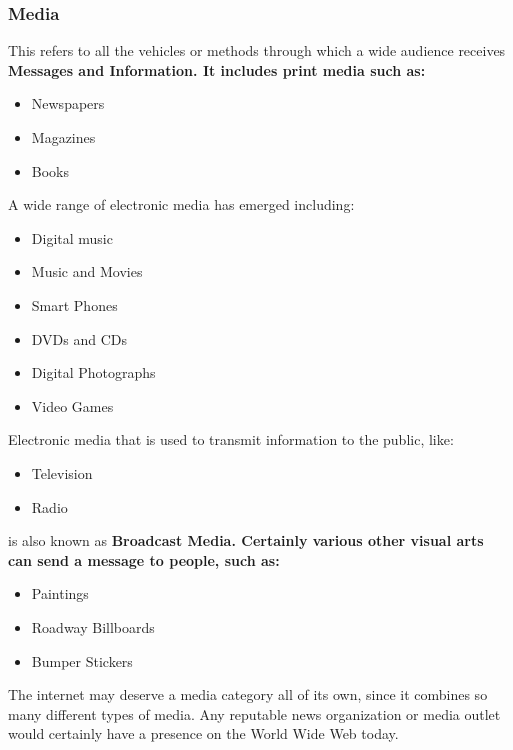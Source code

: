 
\subsubsection*{Media}

This refers to all the vehicles or methods through which a wide audience receives \bf{Messages} and \bf{Information}. It includes print media such as:

\begin{itemize}
    \item Newspapers
    \item Magazines
    \item Books
\end{itemize}

A wide range of electronic media has emerged including:

\begin{itemize}
    \item Digital music
    \item Music and Movies
    \item Smart Phones
    \item DVDs and CDs
    \item Digital Photographs
    \item Video Games
\end{itemize}

Electronic media that is used to transmit information to the public, like:

\begin{itemize}
    \item Television
    \item Radio
\end{itemize}

is also known as \bf{Broadcast Media}. Certainly various other visual arts can send a message to people, such as:

\begin{itemize}
    \item Paintings
    \item Roadway Billboards
    \item Bumper Stickers
\end{itemize}

The internet may deserve a media category all of its own, since it combines so many different types of media. Any reputable news organization or media outlet would certainly have a presence on the World Wide Web today.

